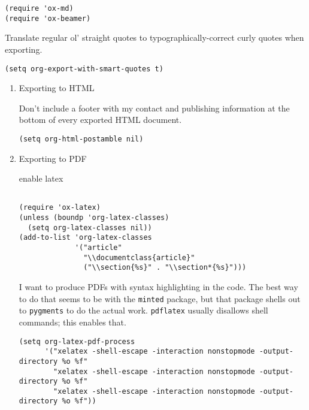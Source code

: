 \documentclass{article}
\begin{document}
\begin{enumerate}
\begin{verbatim}
(require 'ox-md)
(require 'ox-beamer)
\end{verbatim}


Translate regular ol' straight quotes to typographically-correct curly quotes
when exporting.

\begin{verbatim}
(setq org-export-with-smart-quotes t)
\end{verbatim}

\begin{enumerate}
\item Exporting to HTML
\label{sec:orge8721c6}

Don't include a footer with my contact and publishing information at the bottom
of every exported HTML document.

\begin{verbatim}
(setq org-html-postamble nil)
\end{verbatim}



\item Exporting to PDF
\label{sec:orgdf082f3}

enable latex

\begin{verbatim}

(require 'ox-latex)
(unless (boundp 'org-latex-classes)
  (setq org-latex-classes nil))
(add-to-list 'org-latex-classes
			 '("article"
			   "\\documentclass{article}"
			   ("\\section{%s}" . "\\section*{%s}")))

\end{verbatim}



I want to produce PDFs with syntax highlighting in the code. The best way to do
that seems to be with the \texttt{minted} package, but that package shells out to
\texttt{pygments} to do the actual work. \texttt{pdflatex} usually disallows shell commands;
this enables that.

\begin{verbatim}
(setq org-latex-pdf-process
	  '("xelatex -shell-escape -interaction nonstopmode -output-directory %o %f"
		"xelatex -shell-escape -interaction nonstopmode -output-directory %o %f"
		"xelatex -shell-escape -interaction nonstopmode -output-directory %o %f"))
\end{verbatim}


\end{enumerate}
\end{enumerate}
\end{document}

